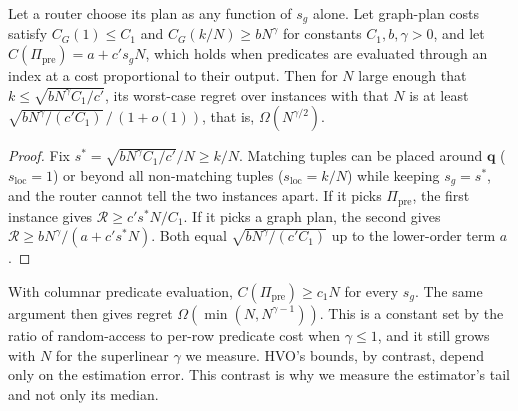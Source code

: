 \documentclass[sigconf,nonacm]{acmart}
\newcommand{\sg}{s_g}
\newcommand{\sloc}{s_{\text{loc}}}
\newcommand{\Ppre}{\Pi_{\text{pre}}}
\begin{document}
\begin{proposition}\label{prop:unbounded}
Let a router choose its plan as any function of $\sg$ alone. Let graph-plan costs satisfy $C_G(1)\le C_1$ and $C_G(k/N)\ge bN^\gamma$ for constants $C_1,b,\gamma>0$, and let $C(\Ppre)=a+c'\sg N$, which holds when predicates are evaluated through an index at a cost proportional to their output. Then for $N$ large enough that $k\le\sqrt{bN^\gamma C_1/c'}$, its worst-case regret over instances with that $N$ is at least $\sqrt{bN^\gamma/(c'C_1)}\,/\,(1+o(1))$, that is, $\Omega(N^{\gamma/2})$.
\end{proposition}
\begin{proof}
Fix $s^*=\sqrt{bN^\gamma C_1/c'}/N\ge k/N$. Matching tuples can be placed around $\mathbf{q}$ ($\sloc=1$) or beyond all non-matching tuples ($\sloc=k/N$) while keeping $\sg=s^*$, and the router cannot tell the two instances apart. If it picks $\Ppre$, the first instance gives $\mathcal{R}\ge c's^*N/C_1$. If it picks a graph plan, the second gives $\mathcal{R}\ge bN^\gamma/(a+c's^*N)$. Both equal $\sqrt{bN^\gamma/(c'C_1)}$ up to the lower-order term $a$.
\end{proof}
With columnar predicate evaluation, $C(\Ppre)\ge c_1N$ for every $\sg$. The same argument then gives regret $\Omega(\min(N, N^{\gamma-1}))$. This is a constant set by the ratio of random-access to per-row predicate cost when $\gamma\le1$, and it still grows with $N$ for the superlinear $\gamma$ we measure. HVO's bounds, by contrast, depend only on the estimation error. This contrast is why we measure the estimator's tail and not only its median.
\end{document}

